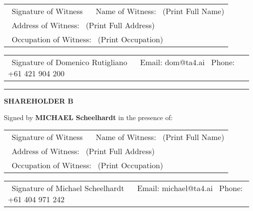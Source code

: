 \begin{tabular}{@{}p{}@{}}
\hrulefill \
Signature of Witness \
\vspace{1ex} \
Name of Witness: \
(Print Full Name) \\
\hrulefill \
Address of Witness: \
(Print Full Address) \\
\hrulefill \
Occupation of Witness: \
(Print Occupation)
\end{tabular}
\hspace{0.05\textwidth} %
\begin{tabular}{@{}p{}@{}}
\hrulefill \
Signature of Domenico Rutigliano \
\vspace{1ex} \
Email: dom@ta4.ai \
Phone: +61 421 904 200
\end{tabular}

\vspace{6ex}

\noindent\rule{\textwidth}{0.4pt} %
\vspace{2ex}

\textbf{SHAREHOLDER B}

\vspace{2ex}

\noindent Signed by \textbf{MICHAEL Scheelhardt} in the presence of:

\vspace{4ex}

\begin{tabular}{@{}p{}@{}}
\hrulefill \
Signature of Witness \
\vspace{1ex} \
Name of Witness: \
(Print Full Name) \\
\hrulefill \
Address of Witness: \
(Print Full Address) \\
\hrulefill \
Occupation of Witness: \
(Print Occupation)
\end{tabular}
\hspace{0.05\textwidth} %
\begin{tabular}{@{}p{}@{}}
\hrulefill \
Signature of Michael Scheelhardt \
\vspace{1ex} \
Email: michael@ta4.ai \
Phone: +61 404 971 242
\end{tabular}

\vspace{6ex}

